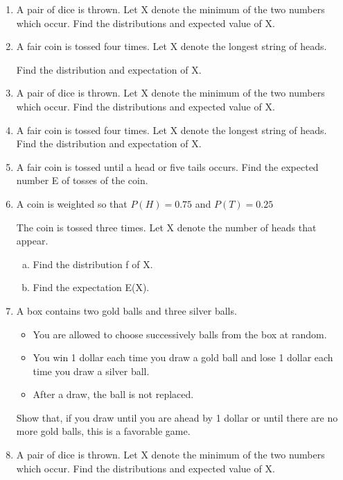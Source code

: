 \documentclass[a4paper,12pt]{article}
\begin{document}
	
	\begin{enumerate}
		\item 
		A pair of dice is thrown. Let X denote the minimum of the two numbers which occur.
		Find the distributions and expected value of X.
		
		\item A fair coin is tossed four times.
		Let X denote the longest string of heads.
		
		Find the distribution and expectation of X.
		

\item A pair of dice is thrown. Let X denote the minimum of the two numbers which occur.
Find the distributions and expected value of X.

\item A fair coin is tossed four times.
Let X denote the longest string of heads.
Find the distribution and expectation of X.
\item 
A fair coin is tossed until a head or five tails occurs.
Find the expected number E of tosses of the coin.

\item A coin is weighted so that $P(H) = 0.75$ and $P(T ) = 0.25$

The coin is tossed three times. Let X denote the number of
heads that appear.
\begin{enumerate}[(a)]
	\item  Find the distribution f of X.
	\item  Find the expectation E(X).
\end{enumerate}

\item 
A box contains two gold balls and three silver balls. 
\begin{itemize}
	\item You are allowed to choose
	successively balls from the box at random. 
	\item You win 1 dollar each time you
	draw a gold ball and lose 1 dollar each time you draw a silver ball. 
	\item After a
	draw, the ball is not replaced.
\end{itemize} Show that, if you draw until you are ahead by
1 dollar or until there are no more gold balls, this is a favorable game.


\item
A pair of dice is thrown. Let X denote the minimum of the two numbers which occur.
Find the  distributions and expected value of X.


\end{enumerate}
\end{document}
